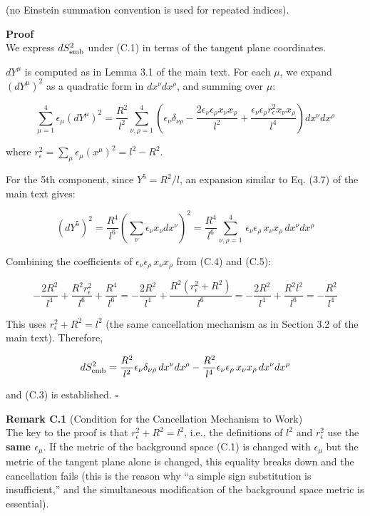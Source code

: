 \documentclass[a4paper,11pt]{article}
\theoremstyle{definition}
\begin{document}
(no Einstein summation convention is used for repeated indices).

\textbf{Proof}\\
We express \(dS^2_{\rm emb}\) under (C.1) in terms of the tangent plane coordinates.

\(dY^\mu\) is computed as in Lemma 3.1 of the main text. For each \(\mu\), we expand \((dY^\mu)^2\) as a quadratic form in \(dx^\nu dx^\rho\), and summing over \(\mu\):

\[\sum_{\mu=1}^4 \epsilon_\mu (dY^\mu)^2 = \frac{R^2}{l^2} \sum_{\nu,\rho=1}^4 \left(\epsilon_\nu \delta_{\nu\rho} - \frac{2\epsilon_\nu \epsilon_\rho x_\nu x_\rho}{l^2} + \frac{\epsilon_\nu \epsilon_\rho r_\epsilon^2 x_\nu x_\rho}{l^4}\right) dx^\nu dx^\rho \tag{C.4}\]

where \(r_\epsilon^2 = \sum_\mu \epsilon_\mu (x^\mu)^2 = l^2 - R^2\).

For the 5th component, since \(Y^5 = R^2/l\), an expansion similar to Eq. (3.7) of the main text gives:

\[(dY^5)^2 = \frac{R^4}{l^6}\left(\sum_\nu \epsilon_\nu x_\nu dx^\nu\right)^2 = \frac{R^4}{l^6}\sum_{\nu,\rho=1}^4\,\epsilon_\nu \epsilon_\rho\, x_\nu x_\rho\, dx^\nu dx^\rho \tag{C.5}\]

Combining the coefficients of \(\epsilon_\nu \epsilon_\rho\, x_\nu x_\rho\) from (C.4) and (C.5):

\[-\frac{2R^2}{l^4} + \frac{R^2 r_\epsilon^2}{l^6} + \frac{R^4}{l^6} = -\frac{2R^2}{l^4} + \frac{R^2(r_\epsilon^2 + R^2)}{l^6} = -\frac{2R^2}{l^4} + \frac{R^2 l^2}{l^6} = -\frac{R^2}{l^4}\]

This uses \(r_\epsilon^2 + R^2 = l^2\) (the same cancellation mechanism as in Section 3.2 of the main text). Therefore,

\[dS^2_{\rm emb} = \frac{R^2}{l^2}\epsilon_\nu \delta_{\nu\rho}\, dx^\nu dx^\rho - \frac{R^2}{l^4}\epsilon_\nu \epsilon_\rho\, x_\nu x_\rho\, dx^\nu dx^\rho\]

and (C.3) is established. \(\square\)

\textbf{Remark C.1} (Condition for the Cancellation Mechanism to Work)\\
The key to the proof is that \(r_\epsilon^2 + R^2 = l^2\), i.e., the definitions of \(l^2\) and \(r_\epsilon^2\) use the \textbf{same \(\epsilon_\mu\)}. If the metric of the background space (C.1) is changed with \(\epsilon_\mu\) but the metric of the tangent plane alone is changed, this equality breaks down and the cancellation fails (this is the reason why ``a simple sign substitution is insufficient,'' and the simultaneous modification of the background space metric is essential).
\end{document}
